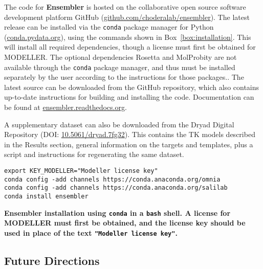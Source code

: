 \documentclass[aps,prl,preprint,nofootinbib,superscriptaddress,linenumbers]{revtex4-1}
\begin{document}
The code for {\bf Ensembler} is hosted on the collaborative open source software development platform GitHub (\href{http://github.com/choderalab/ensembler}{github.com/choderalab/ensembler}).
The latest release can be installed via the {\tt conda} package manager for Python (\href{http://conda.pydata.org}{conda.pydata.org}), using the commands shown in Box~\ref{box:installation}.
This will install all required dependencies, though a license must first be obtained for MODELLER.
The optional dependencies Rosetta and MolProbity are not available through the {\tt conda} package manager, and thus must be installed separately by the user according to the instructions for those packages..
The latest source can be downloaded from the GitHub repository, which also contains up-to-date instructions for building and installing the code.
Documentation can be found at \href{http://ensembler.readthedocs.org/en/latest/}{ensembler.readthedocs.org}.

A supplementary dataset can also be downloaded from the Dryad Digital Repository (DOI: \href{https://dx.doi.org/10.5061/dryad.7fg32}{10.5061/dryad.7fg32}).
This contains the TK models described in the Results section, general information on the targets and templates, plus a script and instructions for regenerating the same dataset.

\begin{codebox}[tbp]
\scriptsize
\begin{Verbatim}[frame=single]
export KEY_MODELLER="Modeller license key"
conda config -add channels https://conda.anaconda.org/omnia
conda config -add channels https://conda.anaconda.org/salilab
conda install ensembler
\end{Verbatim}
\caption{{\bf Ensembler installation using {\tt conda} in a {\tt bash} shell. A license for MODELLER must first be obtained, and the license key should be used in place of the text {\tt "Modeller license key"}.}
}
\label{box:installation}
\end{codebox}

\subsection*{Future Directions}
\end{document}
